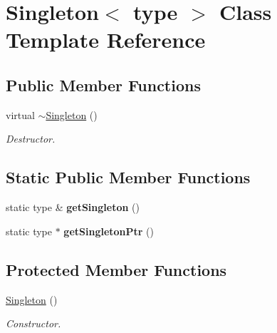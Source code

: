 \hypertarget{classSingleton}{\section{\-Singleton$<$ type $>$ \-Class \-Template \-Reference}
\label{classSingleton}
}
\subsection*{\-Public \-Member \-Functions}
\begin{DoxyCompactItemize}
\item 
\hypertarget{classSingleton_ae4796cfb8f04fba7bb556e2a8c389162}{virtual \hyperlink{classSingleton_ae4796cfb8f04fba7bb556e2a8c389162}{$\sim$\-Singleton} ()}\label{classSingleton_ae4796cfb8f04fba7bb556e2a8c389162}

\begin{DoxyCompactList}\small\item\em \-Destructor. \end{DoxyCompactList}\end{DoxyCompactItemize}
\subsection*{\-Static \-Public \-Member \-Functions}
\begin{DoxyCompactItemize}
\item 
\hypertarget{classSingleton_a5c8fb723215374aecde038fe7ca205fc}{static type \& {\bfseries get\-Singleton} ()}\label{classSingleton_a5c8fb723215374aecde038fe7ca205fc}

\item 
\hypertarget{classSingleton_a86b173e3d50f8a902380f354f2213677}{static type $\ast$ {\bfseries get\-Singleton\-Ptr} ()}\label{classSingleton_a86b173e3d50f8a902380f354f2213677}

\end{DoxyCompactItemize}
\subsection*{\-Protected \-Member \-Functions}
\begin{DoxyCompactItemize}
\item 
\hyperlink{classSingleton_ab357f8b89622a5207c7c3e58bf43bfb9}{\-Singleton} ()
\begin{DoxyCompactList}\small\item\em \-Constructor. \end{DoxyCompactList}\end{DoxyCompactItemize}
